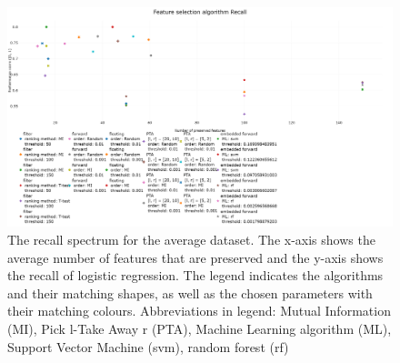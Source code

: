 \documentclass[10pt,a4paper]{article}
\begin{document}
\begin{figure}[H]
	\centering
	\includegraphics[angle=90,height=1.4\textwidth]{Recall_new.png}
	\caption{The recall spectrum for the average dataset. The x-axis shows the average number of features that are preserved and the y-axis shows the recall of logistic regression. The legend indicates the algorithms and their matching shapes, as well as the chosen parameters with their matching colours. Abbreviations in legend: Mutual Information (MI), Pick l-Take Away r (PTA), Machine Learning algorithm (ML), Support Vector Machine (svm), random forest (rf)}
	\label{fig:Avg_Recall_Spectrum}
\end{figure}
\end{document}
